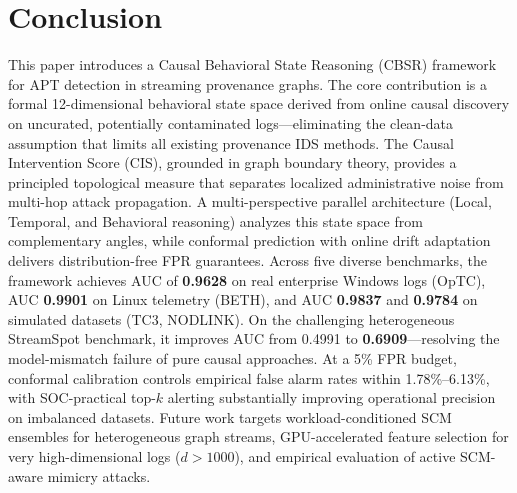 \section{Conclusion}
This paper introduces a Causal Behavioral State Reasoning (CBSR) framework for APT detection in streaming provenance graphs. The core contribution is a formal 12-dimensional behavioral state space derived from online causal discovery on uncurated, potentially contaminated logs---eliminating the clean-data assumption that limits all existing provenance IDS methods. The Causal Intervention Score (CIS), grounded in graph boundary theory, provides a principled topological measure that separates localized administrative noise from multi-hop attack propagation. A multi-perspective parallel architecture (Local, Temporal, and Behavioral reasoning) analyzes this state space from complementary angles, while conformal prediction with online drift adaptation delivers distribution-free FPR guarantees. Across five diverse benchmarks, the framework achieves AUC of \textbf{0.9628} on real enterprise Windows logs (OpTC), AUC \textbf{0.9901} on Linux telemetry (BETH), and AUC \textbf{0.9837} and \textbf{0.9784} on simulated datasets (TC3, NODLINK). On the challenging heterogeneous StreamSpot benchmark, it improves AUC from 0.4991 to \textbf{0.6909}---resolving the model-mismatch failure of pure causal approaches. At a 5\% FPR budget, conformal calibration controls empirical false alarm rates within 1.78\%--6.13\%, with SOC-practical top-$k$ alerting substantially improving operational precision on imbalanced datasets. Future work targets workload-conditioned SCM ensembles for heterogeneous graph streams, GPU-accelerated feature selection for very high-dimensional logs ($d > 1000$), and empirical evaluation of active SCM-aware mimicry attacks.
